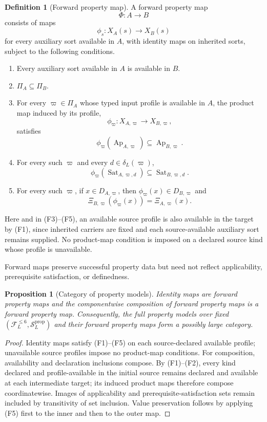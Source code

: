 \documentclass[11pt]{article}
\newcommand{\FVI}{\mathcal F_{L}^{\le 6}}
\newcommand{\Sprop}{\mathcal S_{L}^{\mathrm{prop}}}
\newcommand{\Ap}{\operatorname{Ap}}
\newcommand{\Sat}{\operatorname{Sat}}
\newtheorem{proposition}[theorem]{Proposition}
\theoremstyle{definition}
\newtheorem{definition}[theorem]{Definition}
\theoremstyle{remark}
\begin{document}
\begin{definition}[Forward property map]
\label{def:forward-map}
A forward property map
\[
\Phi:A\longrightarrow B
\]
consists of maps
\[
\phi_s:X_A(s)\longrightarrow X_B(s)
\]
for every auxiliary sort available in \(A\), with identity maps on inherited sorts, subject to the following conditions.
\begin{enumerate}[label=(F\arabic*)]
\item Every auxiliary sort available in \(A\) is available in \(B\).
\item \(\Pi_A\subseteq\Pi_B\).
\item For every \(\varpi\in\Pi_A\) whose typed input profile is available in \(A\), the product map induced by its profile,
\[
\phi_{\varpi}:X_{A,\varpi}\longrightarrow X_{B,\varpi},
\]
satisfies
\[
\phi_{\varpi}(\Ap_{A,\varpi})\subseteq\Ap_{B,\varpi}.
\]
\item For every such \(\varpi\) and every \(d\in\delta_L(\varpi)\),
\[
\phi_{\varpi}(\Sat_{A,\varpi,d})\subseteq\Sat_{B,\varpi,d}.
\]
\item For every such \(\varpi\), if \(x\in D_{A,\varpi}\), then \(\phi_{\varpi}(x)\in D_{B,\varpi}\) and
\[
\Xi_{B,\varpi}(\phi_{\varpi}(x))=\Xi_{A,\varpi}(x).
\]
\end{enumerate}
Here and in (F3)--(F5), an available source profile is also available in the target by (F1), since inherited carriers are fixed and each source-available auxiliary sort remains supplied.
No product-map condition is imposed on a declared source kind whose profile is unavailable.
\end{definition}

Forward maps preserve successful property data but need not reflect applicability, prerequisite satisfaction, or definedness.

\begin{proposition}[Category of property models]
Identity maps are forward property maps and the componentwise composition of forward property maps is a forward property map.
Consequently, the full property models over fixed \((\FVI,\Sprop)\) and their forward property maps form a possibly large category.
\end{proposition}

\begin{proof}
Identity maps satisfy (F1)--(F5) on each source-declared available profile; unavailable source profiles impose no product-map conditions.
For composition, availability and declaration inclusions compose. By (F1)--(F2), every kind declared and profile-available in the initial source remains declared and available at each intermediate target; its induced product maps therefore compose coordinatewise.
Images of applicability and prerequisite-satisfaction sets remain included by transitivity of set inclusion.
Value preservation follows by applying (F5) first to the inner and then to the outer map.
\end{proof}
\end{document}
